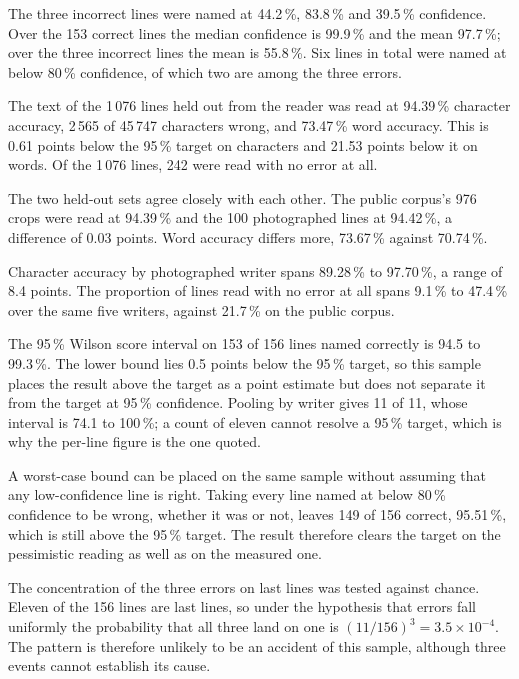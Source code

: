         The three incorrect lines were named at 44.2\,\%, 83.8\,\% and 39.5\,\%
        confidence. Over the 153 correct lines the median confidence is 99.9\,\%
        and the mean 97.7\,\%; over the three incorrect lines the mean is
        55.8\,\%. Six lines in total were named at below 80\,\% confidence, of
        which two are among the three errors.

        The text of the 1\,076 lines held out from the reader was read at
        94.39\,\% character accuracy, 2\,565 of 45\,747 characters wrong, and
        73.47\,\% word accuracy. This is 0.61 points below the 95\,\% target on
        characters and 21.53 points below it on words. Of the 1\,076 lines, 242
        were read with no error at all.

        The two held-out sets agree closely with each other. The public
        corpus's 976 crops were read at 94.39\,\% and the 100 photographed lines
        at 94.42\,\%, a difference of 0.03 points. Word accuracy differs more,
        73.67\,\% against 70.74\,\%.

        Character accuracy by photographed writer spans 89.28\,\% to 97.70\,\%,
        a range of 8.4 points. The proportion of lines read with no error at all
        spans 9.1\,\% to 47.4\,\% over the same five writers, against 21.7\,\%
        on the public corpus.

        \medskip

        The 95\,\% Wilson score interval on 153 of 156 lines named correctly is
        94.5 to 99.3\,\%. The lower bound lies 0.5 points below the 95\,\%
        target, so this sample places the result above the target as a point
        estimate but does not separate it from the target at 95\,\% confidence.
        Pooling by writer gives 11 of 11, whose interval is 74.1 to 100\,\%; a
        count of eleven cannot resolve a 95\,\% target, which is why the
        per-line figure is the one quoted.

        A worst-case bound can be placed on the same sample without assuming
        that any low-confidence line is right. Taking every line named at below
        80\,\% confidence to be wrong, whether it was or not, leaves 149 of 156
        correct, 95.51\,\%, which is still above the 95\,\% target. The result
        therefore clears the target on the pessimistic reading as well as on the
        measured one.

        The concentration of the three errors on last lines was tested against
        chance. Eleven of the 156 lines are last lines, so under the hypothesis
        that errors fall uniformly the probability that all three land on one is
        $(11/156)^{3}=3.5\times10^{-4}$. The pattern is therefore unlikely to be
        an accident of this sample, although three events cannot establish its
        cause.

